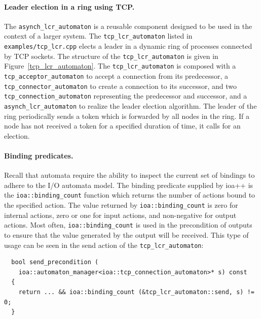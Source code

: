 \paragraph{Leader election in a ring using TCP.}
The \verb+asynch_lcr_automaton+ is a reusable component designed to be used in the context of a larger system.
The \verb+tcp_lcr_automaton+ listed in \verb+examples/tcp_lcr.cpp+ elects a leader in a dynamic ring of processes connected by TCP sockets.
The structure of the \verb+tcp_lcr_automaton+ is given in Figure~\ref{tcp_lcr_automaton}.
The \verb+tcp_lcr_automaton+ is composed with a \verb+tcp_acceptor_automaton+ to accept a connection from its predecessor, a \verb+tcp_connector_automaton+ to create a connection to its successor, and two \verb+tcp_connection_automaton+ representing the predecessor and successor, and a \verb+asynch_lcr_automaton+ to realize the leader election algorithm.
The leader of the ring periodically sends a token which is forwarded by all nodes in the ring.
If a node has not received a token for a specified duration of time, it calls for an election.

\paragraph{Binding predicates.}
Recall that automata require the ability to inspect the current set of bindings to adhere to the I/O automata model.
The binding predicate supplied by ioa++ is the \verb+ioa::binding_count+ function which returns the number of actions bound to the specified action.
The value returned by \verb+ioa::binding_count+ is zero for internal actions, zero or one for input actions, and non-negative for output actions.
Most often, \verb+ioa::binding_count+ is used in the precondition of outputs to ensure that the value generated by the output will be received.
This type of usage can be seen in the send action of the \verb+tcp_lcr_automaton+:
\begin{lstlisting}
  bool send_precondition (
    ioa::automaton_manager<ioa::tcp_connection_automaton>* s) const
  {
    return ... && ioa::binding_count (&tcp_lcr_automaton::send, s) != 0;
  }
\end{lstlisting}

